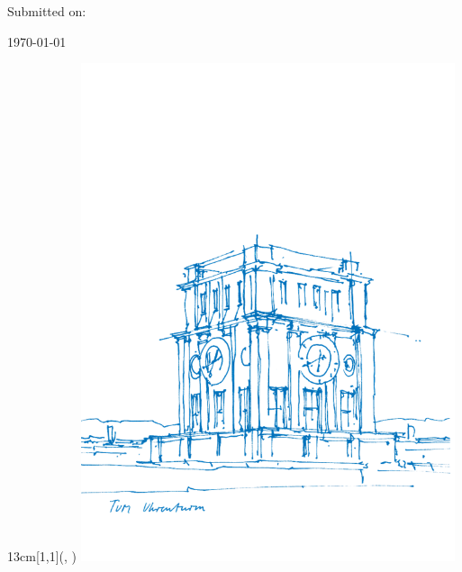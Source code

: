 \begin{titlepage}
    Submitted on: \par
    \par \today \par
    \vfill
    \begin{textblock*}{13cm}[1,1](\dimexpr\paperwidth-20mm,
      \dimexpr\paperheight-10mm)
      \raggedleft
      \includegraphics[width=11cm]{gfx/tum-resources/images/TUM_Uhrenturm.png}\par
    \end{textblock*}
\end{titlepage}

%

